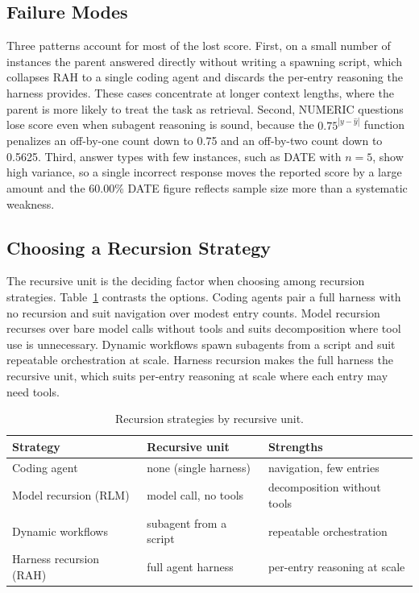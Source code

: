 \documentclass[sigconf,nonacm]{acmart}
\begin{document}
\subsection{Failure Modes}
Three patterns account for most of the lost score. First, on a small number of instances
the parent answered directly without writing a spawning script, which collapses RAH to a
single coding agent and discards the per-entry reasoning the harness provides. These cases
concentrate at longer context lengths, where the parent is more likely to treat the task as
retrieval. Second, NUMERIC questions lose score even when subagent reasoning is sound,
because the $0.75^{|y-\hat{y}|}$ function penalizes an off-by-one count down to 0.75 and an
off-by-two count down to 0.5625. Third, answer types with few instances, such as DATE with
$n=5$, show high variance, so a single incorrect response moves the reported score by a
large amount and the 60.00\% DATE figure reflects sample size more than a systematic
weakness.

\subsection{Choosing a Recursion Strategy}
The recursive unit is the deciding factor when choosing among recursion strategies.
Table~\ref{tab:whentouse} contrasts the options. Coding agents pair a full harness with no
recursion and suit navigation over modest entry counts. Model recursion recurses over bare
model calls without tools and suits decomposition where tool use is unnecessary. Dynamic
workflows spawn subagents from a script and suit repeatable orchestration at scale. Harness
recursion makes the full harness the recursive unit, which suits per-entry reasoning at scale
where each entry may need tools.


\begin{table}[t]
\centering
\small
\caption{Recursion strategies by recursive unit.}
\label{tab:whentouse}
\begin{tabularx}{\linewidth}{@{} l >{\raggedright\arraybackslash}X >{\raggedright\arraybackslash}X @{}}
\toprule
\textbf{Strategy} & \textbf{Recursive unit} & \textbf{Strengths} \\
\midrule
Coding agent & none (single harness) & navigation, few entries \\
\midrule
Model recursion (RLM) & model call, no tools & decomposition without tools \\
\midrule
Dynamic workflows & subagent from a script & repeatable orchestration \\
\midrule
Harness recursion (RAH) & full agent harness & per-entry reasoning at scale \\
\bottomrule
\end{tabularx}
\end{table}
\end{document}
